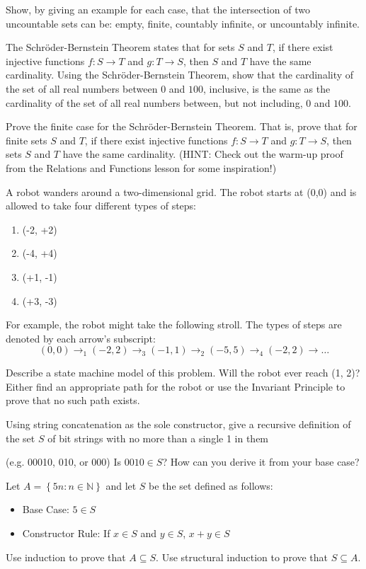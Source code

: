 \documentclass[solution, letterpaper]{cs20}
\begin{document}

Show, by giving an example for each case, that the intersection of two uncountable sets can be: empty, finite, countably
infinite, or uncountably infinite.

\subproblem The Schr\"{o}der-Bernstein Theorem states that for sets $S$ and $T$, if there exist injective functions $f : S \rightarrow T$ and $g : T \rightarrow S$, then $S$ and $T$ have the same cardinality. Using the Schr\"{o}der-Bernstein Theorem, show that the cardinality of the set of all real numbers between $0$ and $100$, inclusive, is the same as the cardinality of the set of all real numbers between, but not including, $0$ and $100$.

\subproblem Prove the finite case for the Schr\"{o}der-Bernstein Theorem. That is, prove that for finite sets $S$ and $T$, if there exist injective functions $f : S \rightarrow T$ and $g : T \rightarrow S$, then sets $S$ and $T$ have the same cardinality. (HINT: Check out the warm-up proof from the Relations and Functions lesson for some inspiration!)

A robot wanders around a two-dimensional grid. The robot starts at (0,0) and is allowed to take four different types of steps:
\begin{enumerate}
\item (-2, +2)
\item (-4, +4)
\item (+1, -1)
\item (+3, -3)
\end{enumerate}
For example, the robot might take the following stroll. The types of steps are denoted by each arrow's subscript:
$$(0,0) \to_1 (-2,2) \to_3 (-1,1) \to_2 (-5,5) \to_4 (-2,2) \to \ldots$$

\subproblem Describe a state machine model of this problem.
\subproblem Will the robot ever reach (1, 2)? Either find an appropriate path for the robot or use the Invariant Principle to prove that no such path exists.

\subproblem Using string concatenation as the sole constructor, give a recursive definition of the set $S$ of bit strings with no more than a single 1 in them 

(e.g. 00010, 010, or 000)
\subproblem Is $0010\in S$? How can you derive it from your base case?

Let $A = \left\{ {5n:n\in\mathbb{N}}\right\}$ and let $S$ be the set defined as follows:
\begin{itemize}
\item Base Case: $5 \in S$
\item Constructor Rule: If $x\in S$ and $y\in S$, $x+y \in S$ 
\end{itemize}
\subproblem Use induction to prove that $A\subseteq S $.
\subproblem Use structural induction to prove that $S\subseteq A$.
\end{document}
